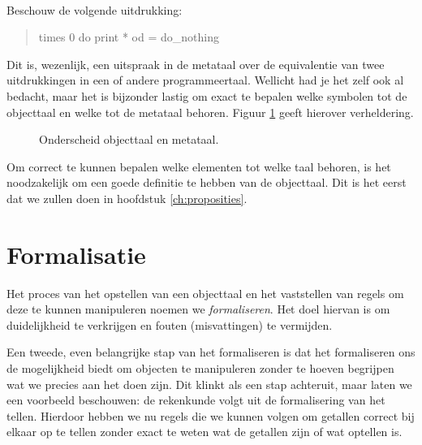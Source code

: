 \begin{example}\mbox{}\\
Beschouw de volgende uitdrukking:
\begin{quote}\begin{texttt}times 0 do print * od = do\_nothing
\end{texttt}\end{quote}
\end{example}
Dit is, wezenlijk, een uitspraak in de metataal over de equivalentie van twee uitdrukkingen in een of andere programmeertaal. Wellicht had je het zelf ook al bedacht, maar het is bijzonder lastig om exact te bepalen welke symbolen tot de objecttaal en welke tot de metataal behoren. Figuur \ref{fig:metataal} geeft hierover verheldering.
\begin{figure}[h]
\begin{center}
\caption{Onderscheid objecttaal en metataal.}\label{fig:metataal}
\end{center}
\end{figure}

Om correct te kunnen bepalen welke elementen tot welke taal behoren, is het noodzakelijk om een goede definitie te hebben van de objecttaal. Dit is het eerst dat we zullen doen in hoofdstuk \ref{ch:proposities}.

\section{Formalisatie}
Het proces van het opstellen van een objecttaal en het vaststellen van regels om deze te kunnen manipuleren noemen we \emph{formaliseren}. Het doel hiervan is om duidelijkheid te verkrijgen en fouten (misvattingen) te vermijden.

Een tweede, even belangrijke stap van het formaliseren is dat het formaliseren ons de mogelijkheid biedt om objecten te manipuleren zonder te hoeven begrijpen wat we precies aan het doen zijn. Dit klinkt als een stap achteruit, maar laten we een voorbeeld beschouwen: de rekenkunde volgt uit de formalisering van het tellen. Hierdoor hebben we nu regels die we kunnen volgen om getallen correct bij elkaar op te tellen zonder exact te weten wat de getallen zijn of wat optellen is.

